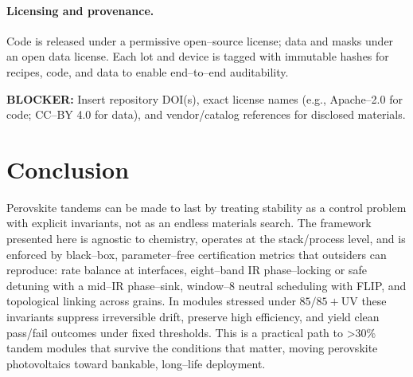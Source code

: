 \documentclass[12pt]{article}
\begin{document}
\paragraph{Licensing and provenance.}
Code is released under a permissive open–source license; data and masks under an open data license. Each lot and device is tagged with immutable hashes for recipes, code, and data to enable end–to–end auditability.

\medskip
\noindent\textbf{BLOCKER:} Insert repository DOI(s), exact license names (e.g., Apache–2.0 for code; CC–BY 4.0 for data), and vendor/catalog references for disclosed materials.

\section{Conclusion}

Perovskite tandems can be made to last by treating stability as a control problem with explicit invariants, not as an endless materials search. The framework presented here is agnostic to chemistry, operates at the stack/process level, and is enforced by black–box, parameter–free certification metrics that outsiders can reproduce: rate balance at interfaces, eight–band IR phase–locking or safe detuning with a mid–IR phase–sink, window–8 neutral scheduling with FLIP, and topological linking across grains. In modules stressed under $85/85+\mathrm{UV}$ these invariants suppress irreversible drift, preserve high efficiency, and yield clean pass/fail outcomes under fixed thresholds. This is a practical path to >30\% tandem modules that survive the conditions that matter, moving perovskite photovoltaics toward bankable, long–life deployment.
\end{document}
